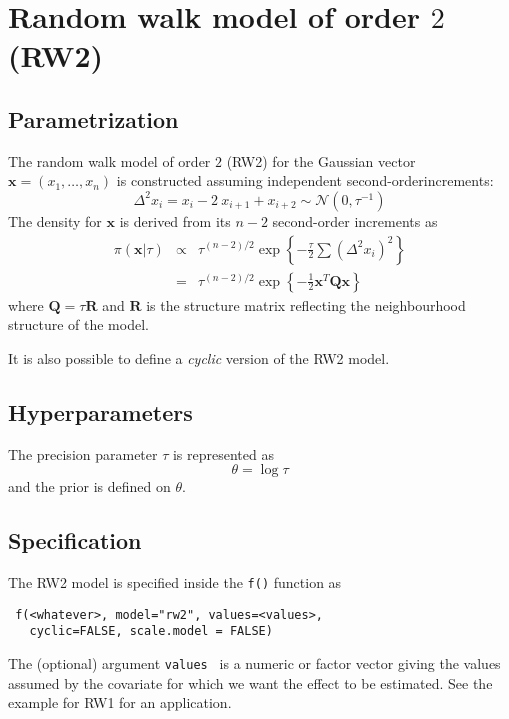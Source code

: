 \documentclass[a4paper,11pt]{article}
\begin{document}
\section*{Random walk model of order $2$ (RW2)}

\subsection*{Parametrization}
The random walk model of order $2$ (RW2) for the Gaussian vector
$\mathbf{x}=(x_1,\dots,x_n)$ is constructed assuming independent
second-orderincrements:
\[
\Delta^2 x_i = x_i-2\ x_{i+1}+x_{i+2}\sim\mathcal{N}(0,\tau^{-1})
\]
The density for $\mathbf{x}$ is derived from its $n-2$ second-order
increments as
\begin{eqnarray}
    \pi(\mathbf{x}|\tau) &\propto& \tau^{(n-2)/2} \exp\left\{-\frac{\tau}{2} \sum (\Delta^2 x_i)^2\right\}\\
    & = &\tau^{(n-2)/2}\exp\left\{-\frac{1}{2}\mathbf{x}^T\mathbf{Q}\mathbf{x} \right\}
\end{eqnarray}
where $\mathbf{Q}=\tau\mathbf{R}$ and $\mathbf{R}$ is the structure
matrix reflecting the neighbourhood structure of the model.

It is also possible to define a {\it cyclic} version of the RW2 model.

\subsection*{Hyperparameters}

The precision parameter $\tau$ is represented as
\begin{displaymath}
    \theta =\log \tau
\end{displaymath}
and the prior is defined on $\theta$.

\subsection*{Specification}

The RW2 model is specified inside the {\tt f()} function as
\begin{verbatim}
 f(<whatever>, model="rw2", values=<values>,
   cyclic=FALSE, scale.model = FALSE)
\end{verbatim}
The (optional) argument {\tt values } is a numeric or factor vector
giving the values assumed by the covariate for which we want the
effect to be estimated. See the example for RW1 for an application.
\end{document}
